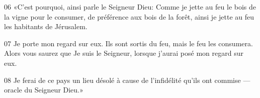 
06 «C’est pourquoi, ainsi parle le Seigneur Dieu: Comme je jette au feu le bois de la vigne pour le consumer, de préférence aux bois de la forêt, ainsi je jette au feu les habitants de Jérusalem.

07 Je porte mon regard sur eux. Ils sont sortis du feu, mais le feu les consumera. Alors vous saurez que Je suis le Seigneur, lorsque j’aurai posé mon regard sur eux.

08 Je ferai de ce pays un lieu désolé à cause de l’infidélité qu’ils ont commise --- oracle du Seigneur Dieu.»